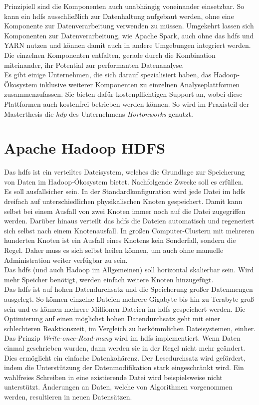 \noindent
Prinzipiell sind die Komponenten auch unabhängig voneinander einsetzbar. So kann ein \gls{hdfs} ausschließlich zur Datenhaltung aufgebaut werden, ohne eine Komponente zur Datenverarbeitung verwenden zu müssen. Umgekehrt lassen sich Komponenten zur Datenverarbeitung, wie Apache Spark, auch ohne das \gls{hdfs} und YARN nutzen und können damit auch in andere Umgebungen integriert werden. Die einzelnen Komponenten entfalten, gerade durch die Kombination miteinander, ihr Potential zur performanten Datenanalyse.\\

\noindent
Es gibt einige Unternehmen, die sich darauf spezialisiert haben, das Hadoop-Ökosystem inklusive weiterer Komponenten zu einzelnen Analyseplattformen zusammenzufassen. Sie bieten dafür kostenpflichtigen Support an, wobei diese Plattformen auch kostenfrei betrieben werden können. So wird im Praxisteil der Masterthesis die \textit{\gls{hdp}} des Unternehmens \textit{Hortonworks} genutzt.


\section{Apache Hadoop HDFS}
\label{sec:theory_hdfs}
Das \acrfull{hdfs} ist ein verteiltes Dateisystem, welches die Grundlage zur Speicherung von Daten im Hadoop-Ökosystem bietet. Nachfolgende Zwecke soll es erfüllen.\\
Es soll ausfallsicher sein. In der Standardkonfiguration wird jede Datei im \gls{hdfs} dreifach auf unterschiedlichen physikalischen Knoten gespeichert. Damit kann selbst bei einem Ausfall von zwei Knoten immer noch auf die Datei zugegriffen werden. Darüber hinaus verteilt das \gls{hdfs} die Dateien automatisch und regeneriert sich selbst nach einem Knotenausfall. In großen Computer-Clustern mit mehreren hunderten Knoten ist ein Ausfall eines Knotens kein Sonderfall, sondern die Regel. Daher muss es sich selbst heilen können, um auch ohne manuelle Administration weiter verfügbar zu sein.\\
Das \gls{hdfs} (und auch Hadoop im Allgemeinen) soll horizontal skalierbar sein. Wird mehr Speicher benötigt, werden einfach weitere Knoten hinzugefügt.\\
Das \gls{hdfs} ist auf hohen Datendurchsatz und die Speicherung großer Datenmengen ausgelegt.
So können einzelne Dateien mehrere Gigabyte bis hin zu Terabyte groß sein und es können mehrere Millionen Dateien im \gls{hdfs} gespeichert werden. Die Optimierung auf einen möglichst hohen Datendurchsatz geht mit einer schlechteren Reaktionszeit, im Vergleich zu herkömmlichen Dateisystemen, einher.\\
Das Prinzip \textit{Write-once-Read-many} wird im \gls{hdfs} implementiert. Wenn Daten einmal geschrieben wurden, dann werden sie in der Regel nicht mehr geändert. Dies ermöglicht ein einfache Datenkohärenz. Der Lesedurchsatz wird gefördert, indem die Unterstützung der Datenmodifikation stark eingeschränkt wird. Ein wahlfreies Schreiben in eine existierende Datei wird beispielsweise nicht unterstützt. Änderungen an Daten, welche von Algorithmen vorgenommen werden, resultieren in neuen Datensätzen.\\

